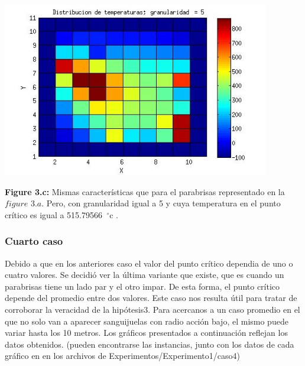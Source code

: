 \includegraphics[width=\textwidth,height=3.0in,keepaspectratio
]{r7h5.jpg} \newline
\begin {flushleft}
\textbf{Figure 3.c:} Mismas características que para el parabrisas representado en la $figure$ $3.a$. Pero, con granularidad igual a 5 y cuya temperatura en el punto crítico es igual a 515.79566\hspace{-1.5mm}$\phantom{a}^{\circ}$c .
\end{flushleft}


\subsubsection{Cuarto caso}


Debido a que en los anteriores caso el valor del punto crítico dependia de uno o cuatro valores. Se decidió ver la última variante que existe, que es cuando un parabrisas tiene un lado par y el otro impar. De esta forma, el punto crítico depende del promedio entre dos valores. \newline
Este caso nos resulta útil para tratar de corroborar la veracidad de la hipótesis3. Para acercanos a un caso promedio en el que no solo van a aparecer sanguijuelas con radio acción bajo, el mismo puede variar hasta los 10 metros. Los gráficos presentados a continuación reflejan los datos obtenidos.   (pueden encontrarse las instancias, junto con los datos de cada gráfico en en los archivos de Experimentos/Experimento1/caso4) 

